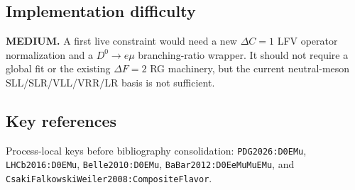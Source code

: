 \subsection*{Implementation difficulty}
\textbf{MEDIUM.}  A first live constraint would need a new \(\Delta C=1\)
LFV operator normalization and a \(D^0\to e\mu\) branching-ratio wrapper.  It
should not require a global fit or the existing \(\Delta F=2\) RG machinery,
but the current neutral-meson SLL/SLR/VLL/VRR/LR basis is not sufficient.

\subsection*{Key references}
Process-local keys before bibliography consolidation:
\texttt{PDG2026:D0EMu}, \texttt{LHCb2016:D0EMu},
\texttt{Belle2010:D0EMu}, \texttt{BaBar2012:D0EeMuMuEMu}, and
\texttt{CsakiFalkowskiWeiler2008:CompositeFlavor}.
